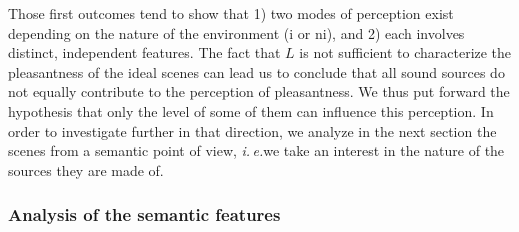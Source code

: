 \documentclass[12pt]{elsarticle}
\newcommand{\ie}{\emph{i.\,e.}}
\begin{document}
Those first outcomes tend to show that 1) two modes of perception exist depending on the nature of the environment (i or ni), and 2) each involves distinct, independent features. The fact that $L$ is not sufficient to characterize the pleasantness of the ideal scenes can lead us to conclude that all sound sources do not equally contribute to the perception of pleasantness. We thus put forward the hypothesis that only the level of some of them can influence this perception. In order to investigate further in that direction, we analyze in the next section the scenes from a semantic point of view, \ie we take an interest in the nature of the sources they are made of.

\subsubsection*{Analysis of the semantic features}
\end{document}
